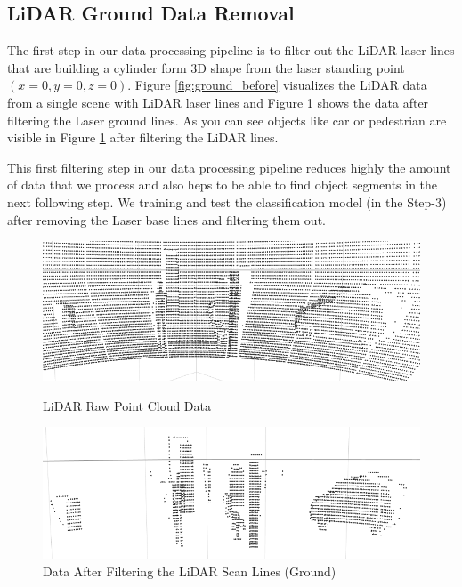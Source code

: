 



\subsection{LiDAR Ground Data Removal}
% 

The first step in our data processing pipeline is to filter out the LiDAR laser lines that are building a cylinder form 3D shape from the laser standing point $(x=0, y=0, z=0)$. Figure \ref{fig:ground_before} visualizes the LiDAR data from a single scene with LiDAR laser lines and Figure \ref{fig:after} shows the data after filtering the Laser ground lines. As you can see objects like car or pedestrian are visible in Figure \ref{fig:after} after filtering the LiDAR lines.

This first filtering step in our data processing pipeline reduces highly the amount of data that we process and also heps to be able to find object segments in the next following step. 
We training and test the classification model (in the Step-3) after removing the Laser base lines and filtering them out.  


\begin{figure}[!h]
\centering
\begin{minipage}{0.49\textwidth}
  \centering
        \includegraphics[width=.9\linewidth]{images/ground_before2.png}
        \caption{LiDAR Raw Point Cloud Data}
        \label{fig:ground_before}
\end{minipage}%
\begin{minipage}{0.49\textwidth}
  \centering
        \includegraphics[width=.9\linewidth]{images/ground_after2.png}
        \caption{Data After Filtering the LiDAR Scan Lines (Ground)}
        \label{fig:after}
\end{minipage}%
\end{figure}


